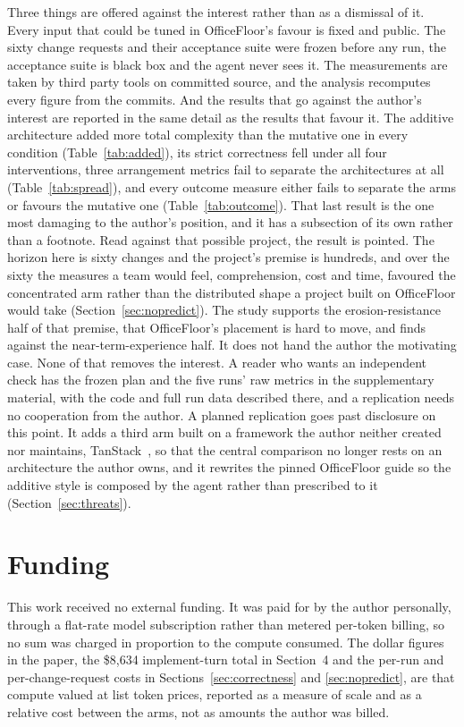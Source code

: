 \documentclass[11pt,a4paper]{article}
\begin{document}
Three things are offered against the interest rather than as a dismissal of it.
Every input that could be tuned in OfficeFloor's favour is fixed and public. The
sixty change requests and their acceptance suite were frozen before any run, the
acceptance suite is black box and the agent never sees it. The measurements are
taken by third party tools on committed source, and the analysis recomputes every
figure from the commits. And the results that go against the author's interest are
reported in the same detail as the results that favour it. The additive
architecture added more total complexity than the mutative one in every condition
(Table~\ref{tab:added}), its strict correctness fell under all four interventions,
three arrangement metrics fail to separate the architectures at all
(Table~\ref{tab:spread}), and every outcome measure either fails to separate the
arms or favours the mutative one (Table~\ref{tab:outcome}). That last result is
the one most damaging to the author's position, and it has a subsection of its
own rather than a footnote. Read against that possible project, the result is
pointed. The horizon here is sixty changes and the project's premise is hundreds,
and over the sixty the measures a team would feel, comprehension, cost and time,
favoured the concentrated arm rather than the distributed shape a project built on
OfficeFloor would take (Section~\ref{sec:nopredict}). The study supports the
erosion-resistance half of that premise, that OfficeFloor's placement is hard to
move, and finds against the near-term-experience half. It does not hand the author
the motivating case. None of that removes the interest. A reader who wants
an independent check has the frozen plan and the five runs' raw metrics in the
supplementary material, with the code and full run data described there, and a
replication needs no cooperation from the author. A planned replication goes past
disclosure on this point. It adds a third arm built on a framework the author neither
created nor maintains, TanStack~\cite{tanstack}, so that the central comparison no longer rests on an
architecture the author owns, and it rewrites the pinned OfficeFloor guide so the
additive style is composed by the agent rather than prescribed to it
(Section~\ref{sec:threats}).

\section*{Funding}

This work received no external funding. It was paid for by the author personally,
through a flat-rate model subscription rather than metered per-token billing, so
no sum was charged in proportion to the compute consumed. The dollar figures in
the paper, the \$8{,}634 implement-turn total in Section~4 and the per-run and
per-change-request costs in Sections~\ref{sec:correctness} and
\ref{sec:nopredict}, are that compute valued at list token prices, reported as a
measure of scale and as a relative cost between the arms, not as amounts the
author was billed.
\end{document}
